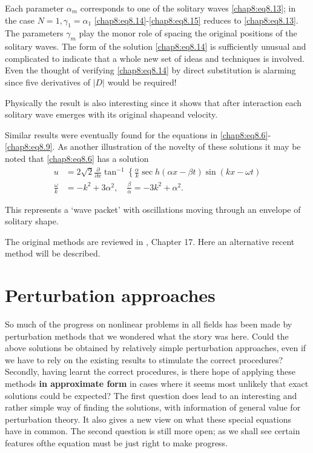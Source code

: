 Each parameter $\alpha_m$ corresponds to one of the solitary waves \eqref{chap8:eq8.13}; in the case $N=1, \gamma_1=\alpha_1$ \eqref{chap8:eq8.14}-\eqref{chap8:eq8.15} reduces to \eqref{chap8:eq8.13}. The parameters $\gamma_m$ play the monor role of spacing the original positions of the solitary waves. The form of the solution \eqref{chap8:eq8.14} is sufficiently unusual and complicated to indicate that a whole new set of ideas and techniques is involved. Even the thought of verifying \eqref{chap8:eq8.14} by direct substitution is alarming since five derivatives of $|D|$ would be required!

Physically the result is also interesting since it shows that after interaction each solitary wave emerges with its original shape\pageoriginale and velocity.

Similar results were eventually found for the equations in \eqref{chap8:eq8.6}-\eqref{chap8:eq8.9}. As another illustration of the novelty of these solutions it may be noted that \eqref{chap8:eq8.6} has a solution
\begin{align*}
u &=2\sqrt{2}\frac{\partial}{\partial x}\tan^{-1}\left\{\frac{\alpha}{k}\sec h(\alpha x-\beta t)\sin(kx-\omega t)\right.\\
\frac{\omega}{k} &= -k^2+3\alpha^2,\quad \frac{\beta}{\alpha}= -3k^2+\alpha^2.
\end{align*}

This represents a `wave packet' with oscillations moving through an envelope of solitary shape.

The original methods are reviewed in \cite{key1}, Chapter 17. Here an alternative recent method will be described.

\section{Perturbation approaches}\label{chap8:sec8.2}

So much of the progress on nonlinear problems in all fields has been made by perturbation methods that we wondered what the story was here. Could the above solutions be obtained by relatively simple perturbation approaches, even if we have to rely on the existing results to stimulate the correct procedures\@? Secondly, having learnt the correct procedures, is there hope of applying these methods {\bf in approximate form} in cases where it seems most unlikely that exact solutions could be expected\@? The first question does lead to an interesting and rather simple way of finding the solutions, with information of general value for perturbation theory. It also gives a new view on what these special equations have in common. The second question is still more open; as we shall see certain features of\pageoriginale the equation must be just right to make progress.

